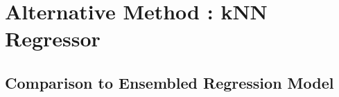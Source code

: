 \section{Alternative Method : kNN Regressor}
\label{sec:Alternative Method}

\subsection{Comparison to Ensembled Regression Model}
